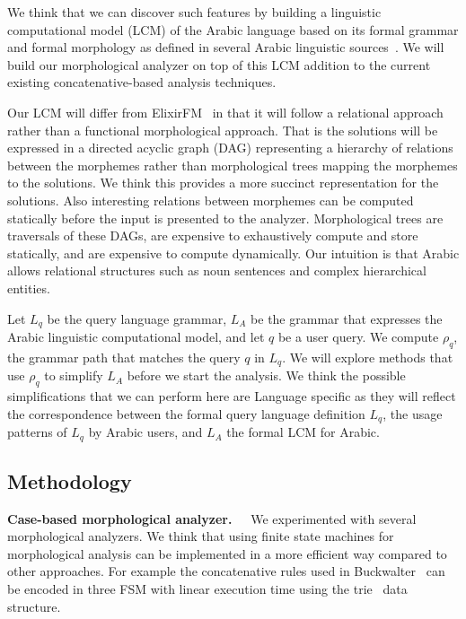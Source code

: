 \documentclass[12pt]{article}
\begin{document}
We think that we can discover such features by building
a linguistic computational model (LCM) of the Arabic language
based on its formal grammar and formal morphology
as defined in several Arabic linguistic 
sources~\cite{Sha73,Abd00,Abd001}.
We will build our morphological analyzer on top 
of this LCM addition to the current existing
concatenative-based analysis techniques. 

Our LCM will differ from ElixirFM~\cite{Otakar:07}
in that it will follow a relational approach rather 
than a functional morphological approach. 
That is the solutions will be expressed in a directed acyclic graph 
(DAG)
representing a hierarchy of relations between the morphemes 
rather than morphological trees mapping the morphemes to the 
solutions.
We think this provides a more succinct
representation for the solutions.
Also interesting relations 
between morphemes can be computed statically before
the input is presented to the analyzer.
Morphological trees are traversals of these DAGs, are expensive 
to exhaustively compute and store statically, 
and are expensive to compute dynamically. 
Our intuition is that Arabic allows relational structures
such as noun sentences and complex hierarchical entities.

Let $L_q$ be the query language grammar, 
$L_A$ be the grammar that expresses the Arabic linguistic
computational model, and let $q$ be a user query.
We compute $\rho_q$, the grammar path that matches 
the query $q$ in $L_q$. 
We will explore methods that use $\rho_q$ to simplify 
$L_A$ before we start the analysis. 
We think the possible simplifications that we can perform
here are Language specific as they will reflect the 
correspondence between the formal query language definition $L_q$, 
the usage patterns of $L_q$  by Arabic users, 
and $L_A$ the formal LCM for Arabic. 


\subsection{Methodology}
\label{s:design:method}

\begin{figure}
\end{figure}

{\bf Case-based morphological analyzer.~~}
We experimented with several morphological analyzers.
We think that using finite state machines for morphological analysis
can be implemented in a more efficient way compared to other 
approaches. 
For example the concatenative rules used in Buckwalter~\cite{Tim04}
can be encoded in three FSM with linear execution time using 
the trie~\cite{Aoe:89} data structure. 
\end{document}
